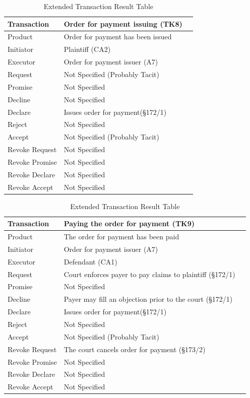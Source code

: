 \begin{landscape}
\begin{table}[h]
\caption{Extended Transaction Result Table}
\label{tab:etrt}
\begin{tabular}{|l||l|l|}
\hline
Transaction  &  Order for payment issuing (TK8) \\ \hline
Product      &  Order for payment has been issued \\ \hline
Initiator      &  Plaintiff (CA2) \\ \hline
Executor       &  Order for payment issuer (A7) \\ \hline
Request        &   Not Specified (Probably Tacit)  \\ \hline
Promise        &    Not Specified   \\ \hline
Decline        &  Not Specified   \\ \hline
Declare        &  Issues order for payment(\S172/1)  \\ \hline
Reject         &  Not Specified   \\ \hline
Accept         & Not Specified (Probably Tacit) \\ \hline
Revoke Request & Not Specified       \\ \hline
Revoke Promise & Not Specified  \\ \hline
Revoke Declare & Not Specified      \\ \hline
Revoke Accept  &  Not Specified \\ \hline
\end{tabular}
\end{table}

\begin{table}[h]
\caption{Extended Transaction Result Table}
\label{tab:etrt}
\begin{tabular}{|l||l|l|}
\hline
Transaction  &  Paying the order for payment (TK9) \\ \hline
Product      &  The order for payment has been paid \\ \hline
Initiator      &  Order for payment issuer (A7) \\ \hline
Executor       &  Defendant (CA1) \\ \hline
Request        &    Court enforces payer to pay claims to plaintiff (\S172/1)
  \\ \hline
Promise        &    Not Specified   \\ \hline
Decline        &  Payer may fill an objection prior to the court (\S172/1)  \\ \hline
Declare        &  Issues order for payment(\S172/1)  \\ \hline
Reject         &  Not Specified   \\ \hline
Accept         & Not Specified (Probably Tacit) \\ \hline
Revoke Request & The court cancels order for payment (\S173/2)       \\ \hline
Revoke Promise & Not Specified  \\ \hline
Revoke Declare & Not Specified      \\ \hline
Revoke Accept  &  Not Specified \\ \hline
\end{tabular}
\end{table}


\end{landscape}
